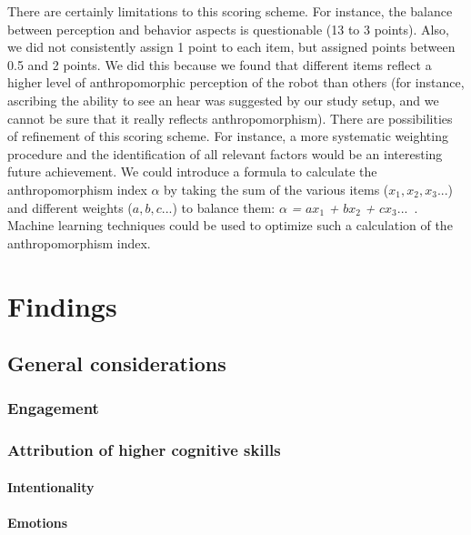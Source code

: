\documentclass{sig-alternate}
\begin{document}
There are certainly limitations to this scoring scheme. For instance, the
balance between perception and behavior aspects is questionable (13 to 3
points). Also, we did not consistently assign 1 point to each item, but assigned
points between 0.5 and 2 points. We did this because we found that different
items reflect a higher level of anthropomorphic perception of the robot than
others (for instance, ascribing the ability to see an hear was suggested by our
study setup, and we cannot be sure that it really reflects anthropomorphism).
There are possibilities of refinement of this scoring scheme. For instance, a
more systematic weighting procedure and the identification of all relevant
factors would be an interesting future achievement. We could introduce a formula
to calculate the anthropomorphism index \textit{$\alpha$} by taking the sum of
the various items ($x_1, x_2, x_3...$) and different weights ($a, b, c ...$) to
balance them: $\alpha$ \textit{=} $a x_1$ \textit{+} $b x_2$ \textit{+} $c x_3
...$~. Machine learning techniques could be used to optimize such a calculation
of the anthropomorphism index.



\section{Findings}

\subsection{General considerations}

\subsubsection{Engagement}

\subsubsection{Attribution of higher cognitive skills}
\paragraph{Intentionality}
\paragraph{Emotions}
\end{document}
